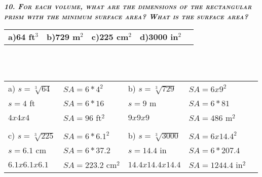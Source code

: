 \documentclass{article}
\begin{document}
\textbf{\emph{\textsc{10. For each volume, what are the dimensions of the rectangular prism with the minimum surface area? What is the surface area?}}} \\
\begin{tabular}{l l l l l}
    \textbf{a)64 ft$^3$} & \textbf{b)729 m$^2$} & \textbf{c)225 cm$^2$} & \textbf{d)3000 in$^2$}
    & \\
\end{tabular} \\ \\
\begin{tabular}{l l l l l}
    a) $s=\sqrt[3]{64}$ & $SA=6*4^2$ & b) $s=\sqrt[3]{729}$ & $SA=6x9^2$
    & \\
    $s=4$ ft & $SA=6*16$ & $s=9$ m & $SA=6*81$
    & \\
    $4x4x4$ & $SA=96$ ft$^2$ & $9x9x9$ & $SA=486$ m$^2$
    & \\ \\
    c) $s=\sqrt[3]{225}$ & $SA=6*6.1^2$ & b) $s=\sqrt[3]{3000}$ & $SA=6x14.4^2$
    & \\
    $s=6.1$ cm & $SA=6*37.2$ & $s=14.4$ in & $SA=6*207.4$
    & \\
    $6.1x6.1x6.1$ & $SA=223.2$ cm$^2$ & $14.4x14.4x14.4$ & $SA=1244.4$ in$^2$
    & \\
\end{tabular}
\end{document}
